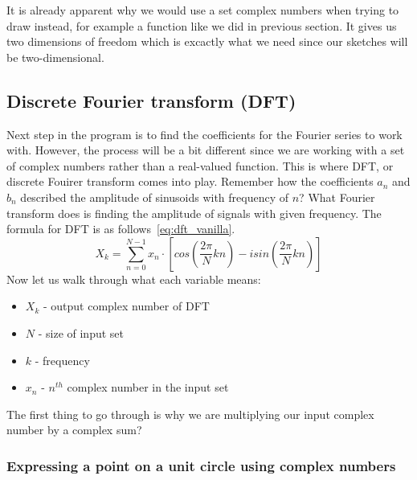 \documentclass{article}
\begin{document}
    It is already apparent why we would use a set complex numbers when trying 
    to draw instead, for example a function like we did in previous section. 
    It gives us two dimensions of freedom which is excactly what we need since
    our sketches will be two-dimensional.


\subsection{Discrete Fourier transform (DFT)}

    Next step in the program is to find the coefficients for the Fourier series
    to work with. However, the process will be a bit different since
    we are working with a set of complex numbers rather than a real-valued function.
    This is where DFT, or discrete Fouirer transform comes into play. Remember
    how the coefficients $a_n$ and $b_n$ described the amplitude of sinusoids with
    frequency of $n$? What Fourier transform does is finding the amplitude of 
    signals with given frequency. The formula for DFT is as follows~\eqref{eq:dft_vanilla}.
    \begin{equation}\label{eq:dft_vanilla}
        X_k = \sum_{n=0}^{N-1}x_n \cdot \left[cos\left(\frac{2\pi}{N}kn\right) - 
        isin\left(\frac{2\pi}{N}kn\right)\right]
    \end{equation}
    Now let us walk through what each variable means:
    \begin{itemize}
        \item $X_k$ - output complex number of DFT
        \item $N$ - size of input set
        \item $k$ - frequency
        \item $x_n$ - $n^{th}$ complex number in the input set
    \end{itemize}
    
    The first thing to go through is why we are multiplying our input complex 
    number by a complex sum?

\subsubsection{Expressing a point on a unit circle using complex numbers}
\end{document}

